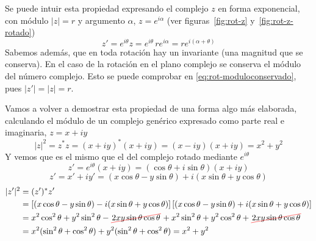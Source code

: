 Se puede intuir esta propiedad expresando el complejo $z$ en forma
exponencial, con módulo $|z| = r$ y argumento $\alpha$,
$z=e^{i\alpha}$ (ver figuras~\ref{fig:rot-z} y~\ref{fig:rot-z-rotado})
\begin{equation}\label{eq:rot-moduloconservado}
  z' = e^{i\theta} z
  = e^{i\theta} \,re^{i\alpha}
  = r e^{i(\alpha+\theta)}
\end{equation}
Sabemos además, que en toda rotación hay un invariante (una magnitud que se
conserva). En el caso de la rotación en el plano complejo se conserva el módulo
del número complejo. Esto se puede comprobar en
\eqref{eq:rot-moduloconservado}, pues $|z'| = |z| = r$.

Vamos a volver a demostrar esta propiedad de una forma algo más elaborada,
calculando el módulo de un complejo genérico expresado como parte real e
imaginaria, $z = x + iy$
\[
  |z|^2 = z^* z = (x+iy)^* (x+iy) = (x-iy) (x+iy) = x^2 + y^2
\]
Y vemos que es el mismo que el del complejo rotado mediante $e^{i\theta}$
\[
  z'
  = e^{i\theta} (x+iy)
  = (\cos\theta + i\sin\theta) (x + iy)
\]
\begin{equation}\label{eq:rot-z'}
  z'
  = x'+iy'
  = (x\cos\theta-y\sin\theta) + i(x\sin\theta + y\cos\theta)
\end{equation}
{\small
\begin{align*}
  |z'|^2
  &= (z')^{*} z'\\
  &=
    \left[(x\cos\theta - y\sin\theta) - i(x\sin\theta + y\cos\theta)\right]
    \left[(x\cos\theta - y\sin\theta) + i(x\sin\theta + y\cos\theta)\right]\\
  &=
    x^2\cos^2\theta + y^2\sin^2\theta - \cancelout{2xy\sin\theta\cos\theta}
    +x^2\sin^2\theta + y^2\cos^2\theta + \cancelout{2xy\sin\theta\cos\theta}\\
  &=
    x^2 (\sin^2\theta + \cos^2\theta) + y^2 (\sin^2\theta + \cos^2\theta)
  =
    x^2 + y^2
\end{align*}
}

